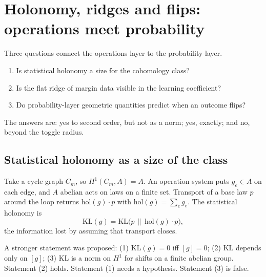 \documentclass[11pt]{article}
\theoremstyle{definition}
\theoremstyle{remark}
\begin{document}
\section{Holonomy, ridges and flips: operations meet probability}\label{sec:bridge2}
Three questions connect the operations layer to the probability layer.
\begin{enumerate}
  \item Is statistical holonomy a size for the cohomology class?
  \item Is the flat ridge of margin data visible in the learning coefficient?
  \item Do probability-layer geometric quantities predict when an outcome flips?
\end{enumerate}
The answers are: yes to second order, but not as a norm; yes, exactly; and no, beyond the toggle radius.

\subsection{Statistical holonomy as a size of the class}
Take a cycle graph $C_m$, so $H^1(C_m,A)=A$. An operation system puts $g_e\in A$ on each edge, and $A$ abelian acts on laws on a finite set. Transport of a base law $p$ around the loop returns $\mathrm{hol}(g)\cdot p$ with $\mathrm{hol}(g)=\sum_e g_e$. The statistical holonomy is
\[ \mathrm{KL}(g)=\mathrm{KL}\bigl(p\,\|\,\mathrm{hol}(g)\cdot p\bigr), \]
the information lost by assuming that transport closes.

A stronger statement was proposed: (1) $\mathrm{KL}(g)=0$ iff $[g]=0$; (2) $\mathrm{KL}$ depends only on $[g]$; (3) $\mathrm{KL}$ is a norm on $H^1$ for shifts on a finite abelian group. Statement (2) holds. Statement (1) needs a hypothesis. Statement (3) is false.
\end{document}
